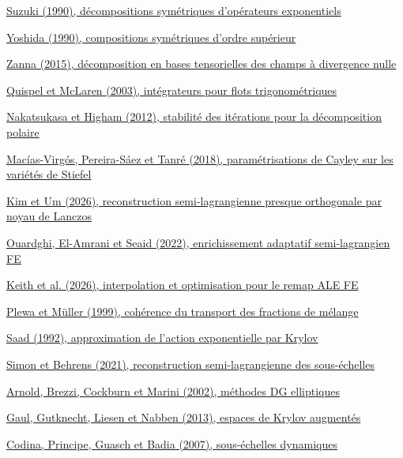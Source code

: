 \documentclass[10pt,a4paper]{article}
\begin{document}
\noindent\href{https://doi.org/10.1016/0375-9601(90)90962-N}{Suzuki (1990), décompositions symétriques d’opérateurs exponentiels}\par
\noindent\href{https://doi.org/10.1016/0375-9601(90)90092-3}{Yoshida (1990), compositions symétriques d’ordre supérieur}\par
\noindent\href{https://doi.org/10.1093/imanum/drt070}{Zanna (2015), décomposition en bases tensorielles des champs à divergence nulle}\par
\noindent\href{https://www.sciencedirect.com/science/article/abs/pii/S0021999103000688}{Quispel et McLaren (2003), intégrateurs pour flots trigonométriques}\par
\noindent\href{https://doi.org/10.1137/110857544}{Nakatsukasa et Higham (2012), stabilité des itérations pour la décomposition polaire}\par
\noindent\href{https://doi.org/10.1016/j.geomphys.2017.08.011}{Macías-Virgós, Pereira-Sáez et Tanré (2018), paramétrisations de Cayley sur les variétés de Stiefel}\par
\noindent\href{https://rtg.hufs.ac.kr/publications/SIGRAPHASIA26_lowres.pdf}{Kim et Um (2026), reconstruction semi-lagrangienne presque orthogonale par noyau de Lanczos}\par
\noindent\href{https://doi.org/10.1016/j.compfluid.2022.105474}{Ouardghi, El-Amrani et Seaid (2022), enrichissement adaptatif semi-lagrangien FE}\par
\noindent\href{https://arxiv.org/html/2611.05327v1}{Keith et al. (2026), interpolation et optimisation pour le remap ALE FE}\par
\noindent\href{https://arxiv.org/abs/astro-ph/9807241}{Plewa et Müller (1999), cohérence du transport des fractions de mélange}\par
\noindent\href{https://epubs.siam.org/doi/10.1137/0729014}{Saad (1992), approximation de l'action exponentielle par Krylov}\par
\noindent\href{https://doi.org/10.1007/s10915-021-01451-w}{Simon et Behrens (2021), reconstruction semi-lagrangienne des sous-échelles}\par
\noindent\href{https://www-users.cse.umn.edu/~arnold/papers/dgerr.pdf}{Arnold, Brezzi, Cockburn et Marini (2002), méthodes DG elliptiques}\par
\noindent\href{https://people.math.ethz.ch/~mhg/pub/defl-GGLN1-SIMAX.pdf}{Gaul, Gutknecht, Liesen et Nabben (2013), espaces de Krylov augmentés}\par
\noindent\href{https://doi.org/10.1016/j.cma.2007.01.002}{Codina, Principe, Guasch et Badia (2007), sous-échelles dynamiques}\par
\end{document}
